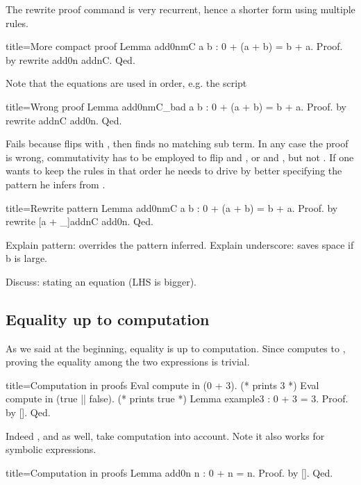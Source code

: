 The rewrite proof command is very recurrent, hence a shorter form
using multiple rules.

\begin{coq}{title=More compact proof}
Lemma add0nmC a b : 0 + (a + b) = b + a.
Proof. by rewrite add0n addnC. Qed.
\end{coq}

Note that the equations are used in order, e.g. the script

\begin{coq}{title=Wrong proof}
Lemma add0nmC_bad a b : 0 + (a + b) = b + a.
Proof. by rewrite addnC add0n. Qed.
\end{coq}

Fails because  flips  with , then
 finds no matching sub term.  In any case the proof
is wrong, commutativity has to be employed to flip  and ,
or  and , but not .  If one wants to keep the rules
in that order he needs to drive \Coq{} by better specifying the
pattern he infers from .

\begin{coq}{title=Rewrite pattern}
Lemma add0nmC a b : 0 + (a + b) = b + a.
Proof. by rewrite [a + _]addnC add0n. Qed.
\end{coq}

Explain pattern: overrides the pattern inferred.
Explain underscore: saves space if b is large.

Discuss: stating an equation (LHS is bigger).

\subsection{Equality up to computation}

As we said at the beginning, equality is up to computation.
Since  computes to , proving the equality among
the two expressions is trivial.

\begin{coq}{title=Computation in proofs}
Eval compute in (0 + 3).  (* prints 3 *)
Eval compute in (true || false).  (* prints true *)
Lemma example3 : 0 + 3 = 3.
Proof. by []. Qed.
\end{coq}

Indeed , and  as well, take computation
into account.
Note it also works for symbolic expressions.

\begin{coq}{title=Computation in proofs}
Lemma add0n n : 0 + n = n.
Proof. by []. Qed.
\end{coq}

